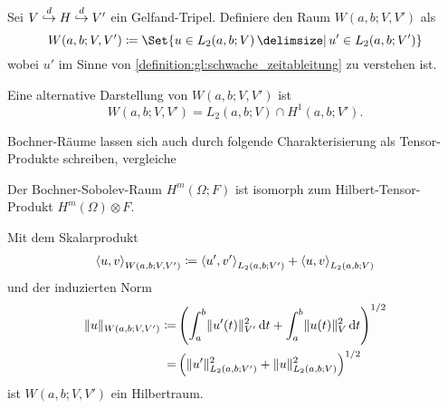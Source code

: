\begin{Definition}
\label{definition:gl:bochner_raum_W}
    Sei $V \stackrel{d}{\hookrightarrow} H \stackrel{d}{\hookrightarrow} V'$ ein Gelfand-Tripel.
    Definiere den Raum $W(a, b; V, V')$ als
    \begin{equation}
        W(a, b; V, V') \deq \Set{u \in L_{2}(a, b; V) \given u' \in L_{2}(a, b; V')}
    \end{equation}
    wobei $u'$ im Sinne von \cref{definition:gl:schwache_zeitableitung} zu verstehen ist.
\end{Definition}

\begin{Bemerkung}
\label{bemerkung:gl:alternative_darstellung_bochner}
    Eine alternative Darstellung von $W(a, b; V, V')$ ist
    \begin{equation}
        W(a, b; V, V') = L_{2}(a, b; V) \cap H^{1}(a, b; V').
    \end{equation}
\end{Bemerkung}

Bochner-Räume lassen sich auch durch folgende Charakterisierung als Tensor-Produkte schreiben, vergleiche \cite[Theorem 12.7.1]{Aubin:2000un}
\begin{Satz}
    Der Bochner-Sobolev-Raum $H^{m}(\Omega; F)$ ist isomorph zum Hilbert-Tensor-Produkt $H^{m}(\Omega) \otimes F$.
\end{Satz}

\begin{Lemma}
\label{lemma:gl:w_a_v_v_ist_hilbertraum}
    Mit dem Skalarprodukt
    \begin{equation}
        \left\langle u,v\right\rangle_{W(a, b; V, V')} \coloneqq \left\langle u',v'\right\rangle_{L_{2}(a, b; V')} +  \left\langle u,v\right\rangle_{L_{2}(a, b; V)}
    \end{equation}
    und der induzierten Norm
    \begin{equation}
        \begin{aligned}
            \lVert u\rVert_{W(a, b; V, V')}
            \coloneqq& \left( \int_{a}^{b} \lVert u'(t)\rVert_{V'}^{2} \mathop{}\!\mathrm{d} t + \int_{a}^{b} \lVert u(t)\rVert_{V}^{2} \mathop{}\!\mathrm{d} t \right)^{1/2}
            \\=& \left( \lVert u'\rVert_{L_{2}(a, b; V')}^{2} + \lVert u\rVert_{L_{2}(a, b; V)}^{2} \right)^{1/2}
        \end{aligned}
    \end{equation}
    ist $W(a, b; V, V')$ ein Hilbertraum.
\end{Lemma}

